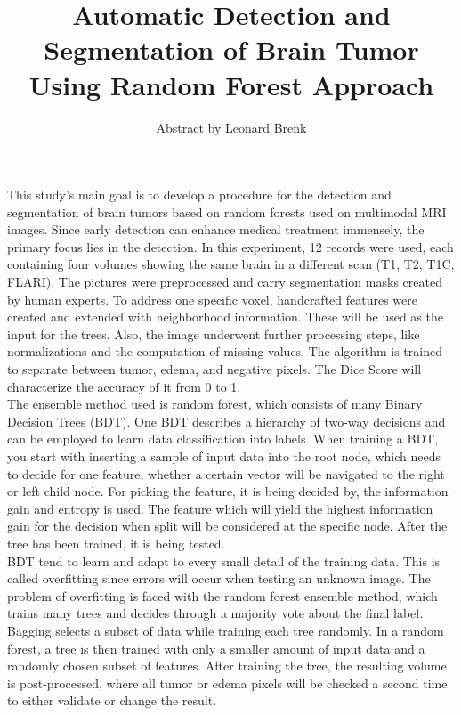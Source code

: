\documentclass{article}
\title{Automatic Detection and Segmentation of Brain Tumor Using Random Forest Approach}
\author{Abstract by Leonard Brenk}
\begin{document}
 \maketitle
 \newpage
 This study's main goal is to develop a procedure for the detection and segmentation of brain tumors based on random forests used on multimodal MRI images. Since early detection can enhance medical treatment immensely, the primary focus lies in the detection. In this experiment, 12 records were used, each containing four volumes showing the same brain in a different scan (T1, T2, T1C, FLARI). The pictures were preprocessed and carry segmentation masks created by human experts. To address one specific voxel, handcrafted features were created and extended with neighborhood information. These will be used as the input for the trees. Also, the image underwent further processing steps, like normalizations and the computation of missing values. The algorithm is trained to separate between tumor, edema, and negative pixels. The Dice Score will characterize the accuracy of it from 0 to 1. \\

 The ensemble method used is random forest, which consists of many Binary Decision Trees (BDT). One BDT describes a hierarchy of two-way decisions and can be employed to learn data classification into labels. When training a BDT, you start with inserting a sample of input data into the root node, which needs to decide for one feature, whether a certain vector will be navigated to the right or left child node. For picking the feature, it is being decided by, the information gain and entropy is used. The feature which will yield the highest information gain for the decision when split will be considered at the specific node. After the tree has been trained, it is being tested. \\
 
 BDT tend to learn and adapt to every small detail of the training data. This is called overfitting since errors will occur when testing an unknown image. The problem of overfitting is faced with the random forest ensemble method, which trains many trees and decides through a majority vote about the final label. Bagging selects a subset of data while training each tree randomly. In a random forest, a tree is then trained with only a smaller amount of input data and a randomly chosen subset of features. After training the tree, the resulting volume is post-processed, where all tumor or edema pixels will be checked a second time to either validate or change the result. \\
 
\end{document}
